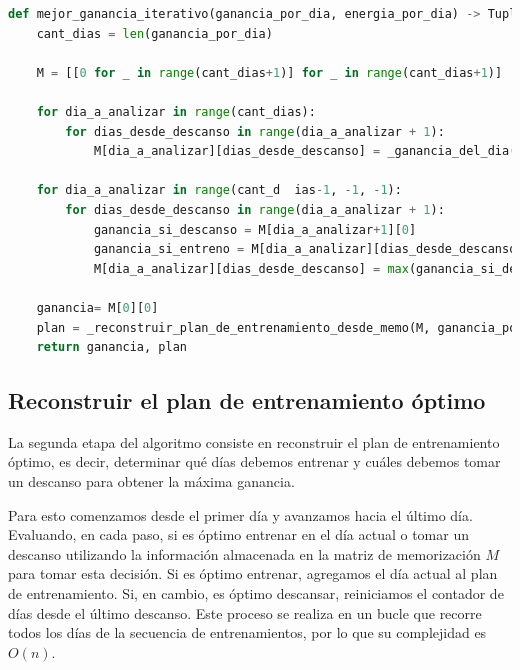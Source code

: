 \documentclass{estilo}
\begin{document}
\begin{lstlisting}[language=Python]
def mejor_ganancia_iterativo(ganancia_por_dia, energia_por_dia) -> Tuple[int, List[int]]:
    cant_dias = len(ganancia_por_dia)

    M = [[0 for _ in range(cant_dias+1)] for _ in range(cant_dias+1)]
    
    for dia_a_analizar in range(cant_dias):
        for dias_desde_descanso in range(dia_a_analizar + 1):
            M[dia_a_analizar][dias_desde_descanso] = _ganancia_del_dia(dia_a_analizar, dias_desde_descanso, ganancia_por_dia, energia_por_dia)
    
    for dia_a_analizar in range(cant_d  ias-1, -1, -1):
        for dias_desde_descanso in range(dia_a_analizar + 1):
            ganancia_si_descanso = M[dia_a_analizar+1][0]
            ganancia_si_entreno = M[dia_a_analizar][dias_desde_descanso] + M[dia_a_analizar+1][dias_desde_descanso+1]
            M[dia_a_analizar][dias_desde_descanso] = max(ganancia_si_descanso, ganancia_si_entreno)
    
    ganancia= M[0][0]
    plan = _reconstruir_plan_de_entrenamiento_desde_memo(M, ganancia_por_dia, energia_por_dia)
    return ganancia, plan
\end{lstlisting}

\newpage
\subsection{Reconstruir el plan de entrenamiento óptimo}
La segunda etapa del algoritmo consiste en reconstruir el plan de entrenamiento óptimo, es decir, determinar qué días debemos entrenar y cuáles debemos tomar un descanso para obtener la máxima ganancia.

Para esto comenzamos desde el primer día y avanzamos hacia el último día. Evaluando, en cada paso, si es óptimo entrenar en el día actual o tomar un descanso utilizando la información almacenada en la matriz de memorización $M$ para tomar esta decisión. Si es óptimo entrenar, agregamos el día actual al plan de entrenamiento. Si, en cambio, es óptimo descansar, reiniciamos el contador de días desde el último descanso.
Este proceso se realiza en un bucle que recorre todos los días de la secuencia de entrenamientos, por lo que su complejidad es $O(n)$.
\end{document}
